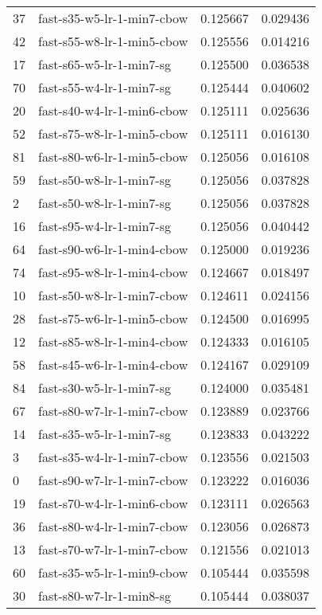 {\begin{tabular}{llrr}
37 &   fast-s35-w5-lr-1-min7-cbow &  0.125667 &  0.029436 \\
42 &   fast-s55-w8-lr-1-min5-cbow &  0.125556 &  0.014216 \\
17 &     fast-s65-w5-lr-1-min7-sg &  0.125500 &  0.036538 \\
70 &     fast-s55-w4-lr-1-min7-sg &  0.125444 &  0.040602 \\
20 &   fast-s40-w4-lr-1-min6-cbow &  0.125111 &  0.025636 \\
52 &   fast-s75-w8-lr-1-min5-cbow &  0.125111 &  0.016130 \\
81 &   fast-s80-w6-lr-1-min5-cbow &  0.125056 &  0.016108 \\
59 &     fast-s50-w8-lr-1-min7-sg &  0.125056 &  0.037828 \\
2  &     fast-s50-w8-lr-1-min7-sg &  0.125056 &  0.037828 \\
16 &     fast-s95-w4-lr-1-min7-sg &  0.125056 &  0.040442 \\
64 &   fast-s90-w6-lr-1-min4-cbow &  0.125000 &  0.019236 \\
74 &   fast-s95-w8-lr-1-min4-cbow &  0.124667 &  0.018497 \\
10 &   fast-s50-w8-lr-1-min7-cbow &  0.124611 &  0.024156 \\
28 &   fast-s75-w6-lr-1-min5-cbow &  0.124500 &  0.016995 \\
12 &   fast-s85-w8-lr-1-min4-cbow &  0.124333 &  0.016105 \\
58 &   fast-s45-w6-lr-1-min4-cbow &  0.124167 &  0.029109 \\
84 &     fast-s30-w5-lr-1-min7-sg &  0.124000 &  0.035481 \\
67 &   fast-s80-w7-lr-1-min7-cbow &  0.123889 &  0.023766 \\
14 &     fast-s35-w5-lr-1-min7-sg &  0.123833 &  0.043222 \\
3  &   fast-s35-w4-lr-1-min7-cbow &  0.123556 &  0.021503 \\
0  &   fast-s90-w7-lr-1-min7-cbow &  0.123222 &  0.016036 \\
19 &   fast-s70-w4-lr-1-min6-cbow &  0.123111 &  0.026563 \\
36 &   fast-s80-w4-lr-1-min7-cbow &  0.123056 &  0.026873 \\
13 &   fast-s70-w7-lr-1-min7-cbow &  0.121556 &  0.021013 \\
60 &   fast-s35-w5-lr-1-min9-cbow &  0.105444 &  0.035598 \\
30 &     fast-s80-w7-lr-1-min8-sg &  0.105444 &  0.038037 \\

\end{tabular}}
